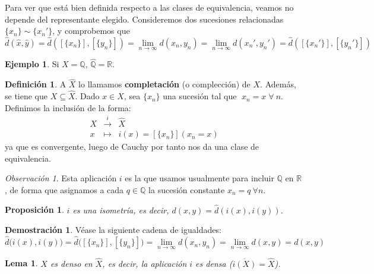 \documentclass[12pt,twoside]{report}
\theoremstyle{azul}
\theoremstyle{azul2}
\theoremstyle{plain}
\newtheorem*{prop}{Proposición}
\newtheorem*{lem}{Lema}
\theoremstyle{definition}
\newtheorem*{eje}{Ejemplo}
\newtheorem*{defi}{Definición}
\newtheorem*{dem}{Demostración}
\theoremstyle{remark}
\newtheorem*{obs}{Observación}
\begin{document}
Para ver que está bien definida respecto a las clases de equivalencia, veamos no depende del representante elegido. Consideremos dos sucesiones relacionadas $\{x_n\} \sim \{x_n'\}$, y comprobemos que $$\hat{d}(\hat{x}, \hat{y})=\hat{d}([\{x_n\}], [\{y_n\}])=\lim_{n \to \infty} d(x_n,y_n)=\lim_{n \to \infty} d(x_n',y_n')=\hat{d}([\{x_n'\}], [\{y_n'\}])$$
\begin{eje}
Si $X= \mathbb{Q}$, $\hat{\mathbb{Q}}= \mathbb{R}$.
\end{eje}
\begin{defi} \justifying
A $\hat{X}$ lo llamamos \textbf{completación} (o complección) de $X$. Además, se tiene que $X\subseteq \hat{X}$. Dado $x \in X$, sea $\{ x_n \}$ una sucesión tal que $\; x_n = x \; \forall \: n$. Definimos la inclusión de la forma:
$$\begin{array}{rcl}
     X & \stackrel{i}{\longrightarrow} & \hat{X} \\
     x & \longmapsto & i(x) = [\{ x_n \}] (x_n=x) 
\end{array}$$
ya que es convergente, luego de Cauchy por tanto nos da una clase de equivalencia.
\end{defi}
\begin{obs}
    Esta aplicación $i$ es la que usamos usualmente para incluir $\mathbb{Q}$ en $\mathbb{R}$, de forma que asignamos a cada $q \in \mathbb{Q}$ la sucesión constante $x_n = q \: \forall n$.
\end{obs}
\begin{prop}
$i$ es una isometría, es decir, $d(x,y)=\hat{d}(i(x), i(y))$.
\end{prop}
\begin{dem} V{\'e}ase la siguiente cadena de igualdades:
$$\hat{d}\big(i(x), i(y)\big)=\hat{d}\big([\{ x_n \}], [\{ y_n \}]\big) = \underset{n \to \infty}{\lim} d(x_n,y_n) = \underset{n \to \infty}{\lim} d(x,y)=d(x,y)$$

\end{dem}
\vspace{3mm}
\begin{tcolorbox}
\begin{lem} $X$ es denso en $\hat{X}$, es decir, la aplicación $i$ es densa \Big($\overline{i(X)} = \hat{X}$\Big). \end{lem}
\end{tcolorbox}
\end{document}
